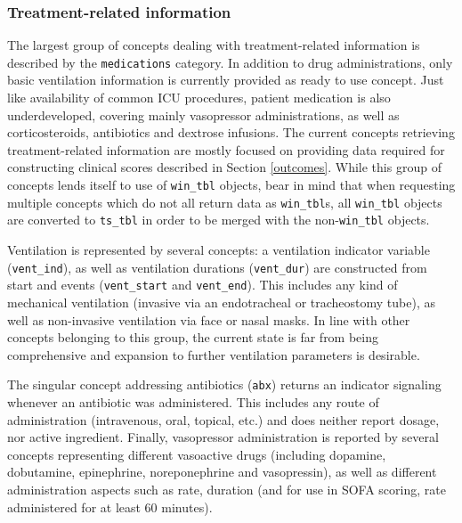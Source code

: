 \documentclass[
  notitle]{jss}
\begin{document}
\hypertarget{treatment-related-information}{%
\subsubsection{Treatment-related
information}\label{treatment-related-information}}

The largest group of concepts dealing with treatment-related information
is described by the \texttt{medications} category. In addition to drug
administrations, only basic ventilation information is currently
provided as ready to use concept. Just like availability of common ICU
procedures, patient medication is also underdeveloped, covering mainly
vasopressor administrations, as well as corticosteroids, antibiotics and
dextrose infusions. The current concepts retrieving treatment-related
information are mostly focused on providing data required for
constructing clinical scores described in Section \ref{outcomes}. While
this group of concepts lends itself to use of \texttt{win\_tbl} objects,
bear in mind that when requesting multiple concepts which do not all
return data as \texttt{win\_tbl}s, all \texttt{win\_tbl} objects are
converted to \texttt{ts\_tbl} in order to be merged with the
non-\texttt{win\_tbl} objects.

Ventilation is represented by several concepts: a ventilation indicator
variable (\texttt{vent\_ind}), as well as ventilation durations
(\texttt{vent\_dur}) are constructed from start and events
(\texttt{vent\_start} and \texttt{vent\_end}). This includes any kind of
mechanical ventilation (invasive via an endotracheal or tracheostomy
tube), as well as non-invasive ventilation via face or nasal masks. In
line with other concepts belonging to this group, the current state is
far from being comprehensive and expansion to further ventilation
parameters is desirable.

The singular concept addressing antibiotics (\texttt{abx}) returns an
indicator signaling whenever an antibiotic was administered. This
includes any route of administration (intravenous, oral, topical, etc.)
and does neither report dosage, nor active ingredient. Finally,
vasopressor administration is reported by several concepts representing
different vasoactive drugs (including dopamine, dobutamine, epinephrine,
noreponephrine and vasopressin), as well as different administration
aspects such as rate, duration (and for use in SOFA scoring, rate
administered for at least 60 minutes).
\end{document}
